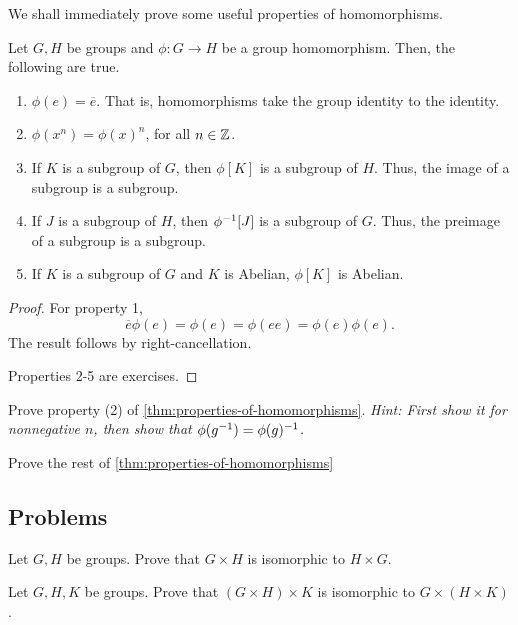 \documentclass[./main.tex]{subfiles}
\begin{document}
We shall immediately prove some useful properties of homomorphisms.
\begin{theorem}
\label{thm:properties-of-homomorphisms}
    Let $G, H$ be groups and $\phi: G \to H$ be a group homomorphism.
    Then, the following are true.
    \begin{enumerate}
        \item $\phi(e) = \overline e$. That is, homomorphisms take the group
        identity to the identity.
        \item $\phi(x^n) = \phi(x)^n$, for all $n \in \mathbb{Z}$.
        \item If $K$ is a subgroup of $G$, then $\phi[K]$ is a subgroup of $H$. Thus, the image of a subgroup is a subgroup.
        \item If $J$ is a subgroup of $H$, then $\phi\inv\paren*{J}$ is a
        subgroup of $G$. Thus, the preimage of a subgroup is a subgroup.
        \item If $K$ is a subgroup of $G$ and $K$ is Abelian, $\phi[K]$ is Abelian.
    \end{enumerate}
\end{theorem}
\begin{proof}
    For property 1, 
    \[
        \overline e \phi(e) = \phi(e) = \phi(ee) = \phi(e)\phi(e). 
    \]
    The result follows by right-cancellation.

    Properties 2-5 are exercises.
\end{proof}

\begin{exercise}
    Prove property (2) of \cref{thm:properties-of-homomorphisms}. \textit{Hint:
    First show it for nonnegative $n$, then show that $\phi(g^{-1}) =
    \phi(g)^{-1}$.}
\end{exercise}

\begin{exercise}
    Prove the rest of \cref{thm:properties-of-homomorphisms}
\end{exercise}

\subsection{Problems}

\begin{exercise}
    Let $G, H$ be groups. Prove that $G \times H$ is isomorphic to $H \times G$.
\end{exercise}

\begin{exercise}
    Let $G, H, K$ be groups. Prove that $(G \times H) \times K$ is isomorphic to
    $G \times (H \times K)$.
\end{exercise}
\end{document}
